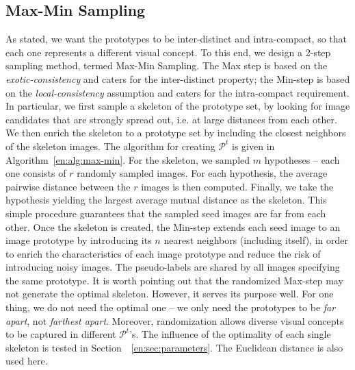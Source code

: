 \subsection{Max-Min Sampling} 
\label{en:sec:max-min}
As stated, we want the prototypes to be inter-distinct and
intra-compact, so that each one represents a different visual
concept. To this end, we design a 2-step sampling method, termed
Max-Min Sampling. The Max step is based on the
\emph{exotic-consistency} and caters for the inter-distinct
property; the Min-step is based on the \emph{local-consistency}
assumption and caters for the intra-compact requirement. In particular, we first
sample a skeleton of the prototype set, by looking for image
candidates that are strongly spread out, i.e. at large distances from
each other. We then enrich the skeleton to a prototype set by
including the closest neighbors of the skeleton images.
The algorithm for creating $\mathcal{P}^t$ is given in
Algorithm~\ref{en:alg:max-min}. For the skeleton, we sampled $m$
hypotheses -- each one consists of $r$ randomly sampled images. 
For each hypothesis, the average pairwise distance between the $r$ images is then computed. 
Finally, we take the hypothesis yielding the largest average mutual distance as the skeleton. 
This simple
procedure guarantees that the sampled seed images are far from each
other. Once the skeleton is created, the Min-step extends each seed
image to an image prototype by introducing its $n$ nearest neighbors
(including itself), in order to enrich the characteristics of each
image prototype and reduce the risk of introducing noisy images. The
pseudo-labels are shared by all images specifying the same prototype.
It is worth pointing out that the randomized Max-step may not generate
the optimal skeleton. However, it serves its purpose well. For one
thing, we do not need the optimal one -- we only need the prototypes
to be \emph{far apart}, not \emph{farthest apart}.  Moreover, randomization allows diverse visual
concepts to be captured in different $\mathcal{P}^t$'s. 
The influence of the optimality of each single skeleton is tested in Section~~\ref{en:sec:parameters}.
The Euclidean distance is also used here. 



